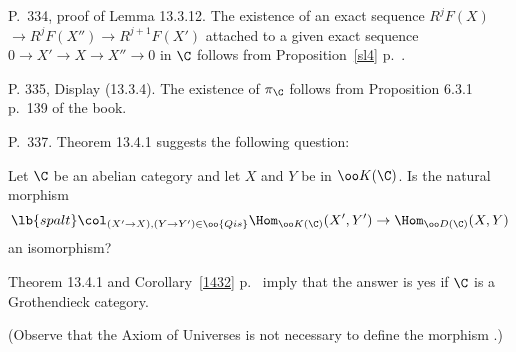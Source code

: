 \documentclass[12pt]{article}
\theoremstyle{remark}
\theoremstyle{definition}
\begin{document}
%

\begin{s}
P.~334, proof of Lemma 13.3.12. %
The existence of an exact sequence $R^jF(X)$ $\to R^jF(X'')\to R^{j+1}F(X')$ attached to a given exact sequence $0\to X'\to X\to X''\to0$ in $\C$ follows from Proposition~\ref{sl4} p.~.
\end{s}

%

\begin{s}
P. 335, Display (13.3.4). The existence of $\pi_\C$ follows from Proposition 6.3.1 p.~139 of the book.
\end{s}

%

\begin{s}
P.~337. Theorem 13.4.1 suggests the following question: 

Let $\C$ be an abelian category and let $X$ and $Y$ be in $\oo K(\C)$. Is the natural morphism 
\begin{equation}\lb{spalt}
\col_{(X'\to X),(Y\to Y')\in\oo{Qis}}\Hom_{\oo K(\C)}(X',Y')\to\Hom_{\oo D(\C)}(X,Y)
\end{equation} 
an isomorphism?

Theorem 13.4.1 and Corollary~\ref{1432} p.~ imply that the answer is yes if $\C$ is a Grothendieck category. 

(Observe that the Axiom of Universes is not necessary to define the morphism .)
\end{s}

%
\end{document}
